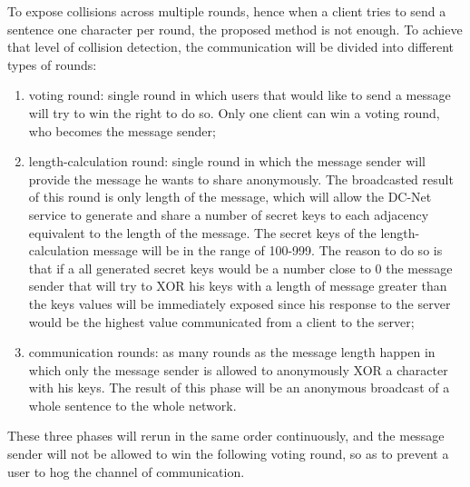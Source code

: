 To expose collisions across multiple rounds, hence when a client tries to send a sentence one character per round, the proposed method is not enough. To achieve that level of collision detection, the communication will be divided into different types of rounds:
\begin{enumerate}
    \item voting round: single round in which users that would like to send a message will try to win the right to do so. Only one client can win a voting round, who becomes the message sender;
    \item length-calculation round: single round in which the message sender will provide the message he wants to share anonymously. The broadcasted result of this round is only length of the message, which will allow the DC-Net service to generate and share a number of secret keys to each adjacency equivalent to the length of the message. The secret keys of the length-calculation message will be in the range of 100-999. The reason to do so is that if a all generated secret keys would be a number close to 0 the message sender that will try to XOR his keys with a length of message greater than the keys values will be immediately exposed since his response to the server would be the highest value communicated from a client to the server;
    \item communication rounds: as many rounds as the message length happen in which only the message sender is allowed to anonymously XOR a character with his keys. The result of this phase will be an anonymous broadcast of a whole sentence to the whole network.
\end{enumerate}
These three phases will rerun in the same order continuously, and the message sender will not be allowed to win the following voting round, so as to prevent a user to hog the channel of communication.

